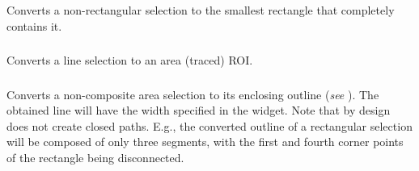 Converts a non-rectangular selection to the smallest rectangle that
completely contains it.


\subsubsection[\protect\userinterface{Line to Area}]{\protect{}\label{sub:Line-to-Area}}

Converts a line selection to an area (traced) ROI.


\subsubsection[\protect\userinterface{Area to Line}]{\protect{}\label{sub:Area-to-Line}}

Converts a non-composite area selection to its enclosing outline (\emph{see}
). The obtained line will have the
width specified in the 
widget. Note that by design  does not
create closed paths. E.g., the converted outline of a rectangular
selection will be composed of only three segments, with the first
and fourth corner points of the rectangle being disconnected.




\subsubsection[\protect\userinterface{Image to Selection\ldots{}}]{\protect{}\label{sub:Image-to-Selection...}}

